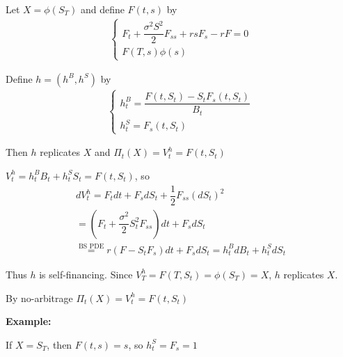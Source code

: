 \par\bigskip
\begin{theo}[]{}
  Let $X = \phi(S_T)$ and define $F(t,s)$ by 
  \begin{equation*}
    \begin{gathered}
      \begin{cases}
        F_t + \dfrac{\sigma^2S^2}{2}F_{ss}+rsF_s-rF = 0\\
        F(T,s)\phi(s)
      \end{cases}
    \end{gathered}
  \end{equation*}
  \par\bigskip
  \noindent Define $h = (h^B,h^S)$ by 
  \begin{equation*}
    \begin{gathered}
      \begin{cases}
        h_t^B = \dfrac{F(t,S_t)-S_tF_s(t,S_t)}{B_t}\\
        h_t^S = F_s(t,S_t)
      \end{cases}
    \end{gathered}
  \end{equation*}
  \par\bigskip
  \noindent Then $h$ replicates $X$ and $\Pi_t(X) = V_t^h = F(t,S_t)$
\end{theo}
\par\bigskip
\begin{prf}[]{}
  $V_t^h = h_t^BB_t + h_t^SS_t = F(t,S_t)$, so 
  \begin{equation*}
    \begin{gathered}
      dV_t^h = F_tdt + F_sdS_t + \dfrac{1}{2}F_{ss}(dS_t)^2\\
      = \left(F_t + \dfrac{\sigma^2}{2}S_t^2F_{ss}\right)dt + F_sdS_t\\
      \stackrel{\text{BS PDE}}{=} r(F-S_tF_s)dt + F_sdS_t = h_t^BdB_t+h_t^SdS_t
    \end{gathered}
  \end{equation*}
  \par\bigskip
  \noindent Thus $h$ is self-financing. Since $V_T^h = F(T,S_t)= \phi(S_T) = X$, $h$ replicates $X$.\par
  \noindent By no-arbitrage $\Pi_t(X) = V_t^h = F(t,S_t)$
\end{prf}
\par\bigskip
\noindent\textbf{Example:}\par
\noindent If $X = S_T$, then $F(t,s) = s$, so $h_t^S = F_s = 1$
\par\bigskip
